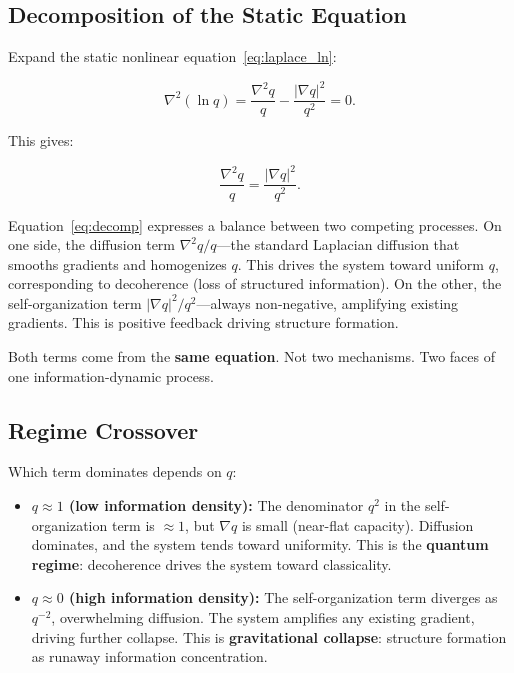 \documentclass[aps,prd,twocolumn,showpacs,superscriptaddress,preprintnumbers]{revtex4-2}
\begin{document}
\subsection{Decomposition of the Static Equation}

Expand the static nonlinear equation~\eqref{eq:laplace_ln}:

\begin{equation}
\nabla^2(\ln q) = \frac{\nabla^2 q}{q} - \frac{|\nabla q|^2}{q^2} = 0.
\label{eq:expand_ln}
\end{equation}

This gives:

\begin{equation}
\boxed{\frac{\nabla^2 q}{q} = \frac{|\nabla q|^2}{q^2}}.
\label{eq:decomp}
\end{equation}

Equation~\eqref{eq:decomp} expresses a balance between two competing processes.
On one side, the diffusion term $\nabla^2 q/q$---the standard Laplacian diffusion that smooths gradients and homogenizes $q$.
This drives the system toward uniform $q$, corresponding to decoherence (loss of structured information).
On the other, the self-organization term $|\nabla q|^2/q^2$---always non-negative, amplifying existing gradients.
This is positive feedback driving structure formation.

Both terms come from the \textbf{same equation}.
Not two mechanisms. Two faces of one information-dynamic process.

\subsection{Regime Crossover}

Which term dominates depends on $q$:

\begin{itemize}
    \item \textbf{$q\approx1$ (low information density):} The denominator $q^2$ in the self-organization term is $\approx1$, but $\nabla q$ is small (near-flat capacity). Diffusion dominates, and the system tends toward uniformity. This is the \textbf{quantum regime}: decoherence drives the system toward classicality.

    \item \textbf{$q\approx0$ (high information density):} The self-organization term diverges as $q^{-2}$, overwhelming diffusion. The system amplifies any existing gradient, driving further collapse. This is \textbf{gravitational collapse}: structure formation as runaway information concentration.
\end{itemize}
\end{document}
